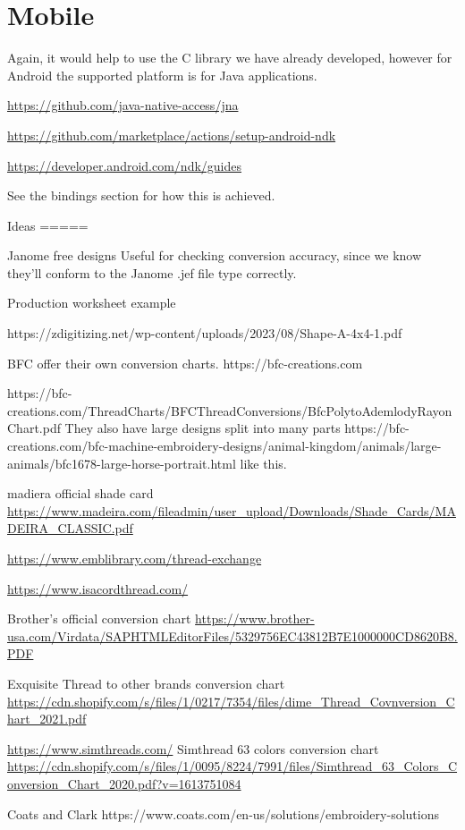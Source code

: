 \documentclass[a4paper]{report}
\begin{document}
\chapter{Mobile}

Again, it would help to use the C library we have already developed,
however for Android the supported platform is for Java applications.

\url{https://github.com/java-native-access/jna}

\url{https://github.com/marketplace/actions/setup-android-ndk}

\url{https://developer.android.com/ndk/guides}

See the bindings section for how this is achieved.

Ideas
=====

Janome free designs %
Useful for checking conversion accuracy, since we know they'll conform to the
Janome .jef file type correctly.

Production worksheet example

https://zdigitizing.net/wp-content/uploads/2023/08/Shape-A-4x4-1.pdf

BFC offer their own conversion charts.
https://bfc-creations.com

https://bfc-creations.com/ThreadCharts/BFCThreadConversions/BfcPolytoAdemlodyRayonChart.pdf
They also have large designs split into many parts
https://bfc-creations.com/bfc-machine-embroidery-designs/animal-kingdom/animals/large-animals/bfc1678-large-horse-portrait.html
like this.

madiera official shade card
\url{https://www.madeira.com/fileadmin/user_upload/Downloads/Shade_Cards/MADEIRA_CLASSIC.pdf}

\url{https://www.emblibrary.com/thread-exchange}

\url{https://www.isacordthread.com/}

Brother's official conversion chart
\url{https://www.brother-usa.com/Virdata/SAPHTMLEditorFiles/5329756EC43812B7E1000000CD8620B8.PDF}

Exquisite Thread to other brands conversion chart
\url{https://cdn.shopify.com/s/files/1/0217/7354/files/dime_Thread_Covnversion_Chart_2021.pdf}

\url{https://www.simthreads.com/}
Simthread 63 colors conversion chart
\url{https://cdn.shopify.com/s/files/1/0095/8224/7991/files/Simthread_63_Colors_Conversion_Chart_2020.pdf?v=1613751084}

Coats and Clark https://www.coats.com/en-us/solutions/embroidery-solutions
\end{document}
